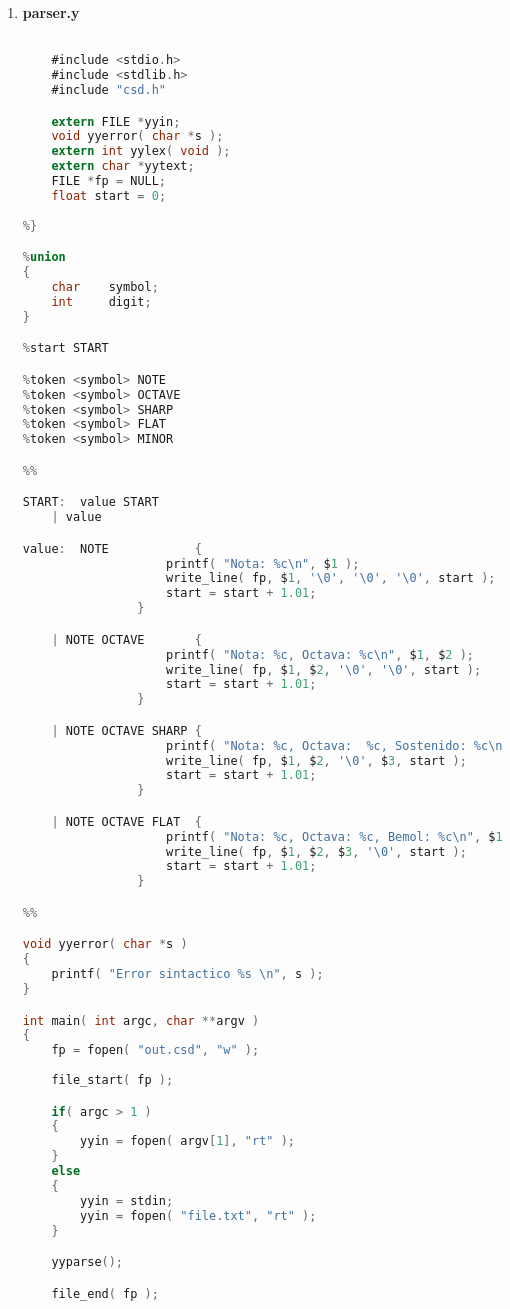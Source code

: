 \documentclass[12pt]{article}
\begin{document}
\begin{enumerate}
\begin{lstlisting}[language=C]
            yyin = stdin;
	}
    escribir_encabezado(fp); 
    yylex();
    escribir_fin(fp);
    fclose(fp);
    return 0;
}

yywrap()
{
}
\end{lstlisting}\\

\item {\bf parser.y}\\
\begin{lstlisting}[language=C]
%{

	#include <stdio.h>
	#include <stdlib.h>
	#include "csd.h"

	extern FILE *yyin;
	void yyerror( char *s );
	extern int yylex( void );
	extern char *yytext;
	FILE *fp = NULL;
	float start = 0;
	
%}

%union
{
	char 	symbol;
	int 	digit;
}

%start START

%token <symbol>	NOTE
%token <symbol>	OCTAVE
%token <symbol>	SHARP
%token <symbol>	FLAT
%token <symbol>	MINOR

%%

START: 	value START 
	| value

value: 	NOTE			{
					printf( "Nota: %c\n", $1 );
					write_line( fp, $1, '\0', '\0', '\0', start );
					start = start + 1.01;
				}

	| NOTE OCTAVE 		{
					printf( "Nota: %c, Octava: %c\n", $1, $2 );
					write_line( fp, $1, $2, '\0', '\0', start );
					start = start + 1.01;
				}

	| NOTE OCTAVE SHARP	{
					printf( "Nota: %c, Octava:  %c, Sostenido: %c\n", $1, $2, $3 );
					write_line( fp, $1, $2, '\0', $3, start );
					start = start + 1.01;
				}

	| NOTE OCTAVE FLAT	{
					printf( "Nota: %c, Octava: %c, Bemol: %c\n", $1, $2, $3 );
					write_line( fp, $1, $2, $3, '\0', start );
					start = start + 1.01;
				}

%%

void yyerror( char *s )
{
	printf( "Error sintactico %s \n", s );
}

int main( int argc, char **argv )
{
	fp = fopen( "out.csd", "w" );
	
	file_start( fp );

	if( argc > 1 )
	{
		yyin = fopen( argv[1], "rt" );
	}
	else
	{
		yyin = stdin;
		yyin = fopen( "file.txt", "rt" );
	}

	yyparse();

	file_end( fp );
	

\end{lstlisting}
\end{enumerate}
\end{document}
